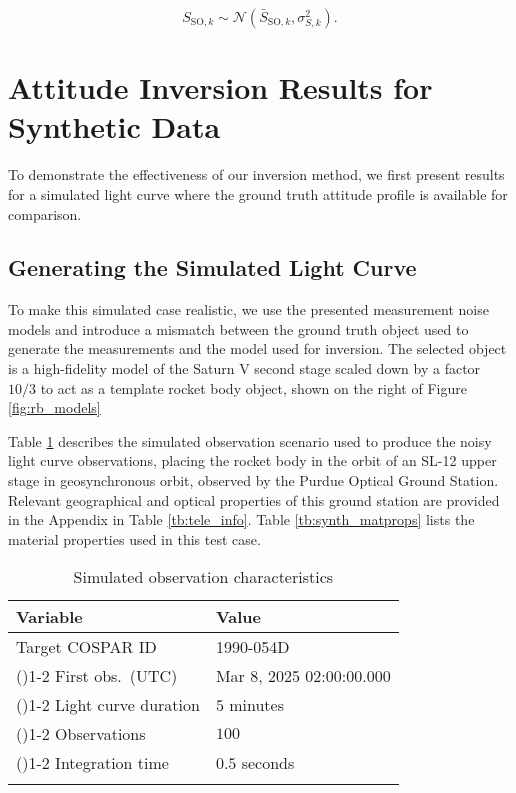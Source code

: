 \documentclass[a4paper,twocolumn]{spaceDebrisC} %
\newcommand{\grule}[0]{\arrayrulecolor{darkgray}\cmidrule(){1-2}}
\newcommand{\brule}[0]{\arrayrulecolor{black} \bottomrule}
\begin{document}
\begin{equation} \label{eq:lc_dist}
 S_{\text{SO},k} \sim \mathcal{N}\left( \bar{S}_{\text{SO},k}, \sigma^2_{S,k} \right).
 \end{equation}

\section{Attitude Inversion Results for Synthetic Data} \label{sec:synth_results}

To demonstrate the effectiveness of our inversion method, we first present results for a simulated light curve where the ground truth attitude profile is available for comparison.

\subsection{Generating the Simulated Light Curve}

To make this simulated case realistic, we use the presented measurement noise models and introduce a mismatch between the ground truth object used to generate the measurements and the model used for inversion. The selected object is a high-fidelity model of the Saturn V second stage scaled down by a factor $10/3$ to act as a template rocket body object, shown on the right of Figure \ref{fig:rb_models}

Table \ref{tb:case1_in} describes the simulated observation scenario used to produce the noisy light curve observations, placing the rocket body in the orbit of an SL-12 upper stage in geosynchronous orbit, observed by the Purdue Optical Ground Station. Relevant geographical and optical properties of this ground station are provided in the Appendix in Table \ref{tb:tele_info}. Table \ref{tb:synth_matprops} lists the material properties used in this test case.

\begin{table}[H]
  \centering
  \renewcommand{\arraystretch}{1.2} 
  \caption{Simulated observation characteristics}
  \vspace*{6pt}
  \begin{tabular}{@{} l l @{}}
    \toprule
 Variable & Value \\ \midrule
 Target COSPAR ID & 1990-054D \\ \grule
 First obs.\ (UTC) & Mar 8, 2025 02:00:00.000 \\ \grule
 Light curve duration & $5$ minutes \\ \grule
 Observations & $100$ \\ \grule
 Integration time & $0.5$ seconds \\ \brule
  \end{tabular}
  \label{tb:case1_in}
\end{table}
\end{document}
